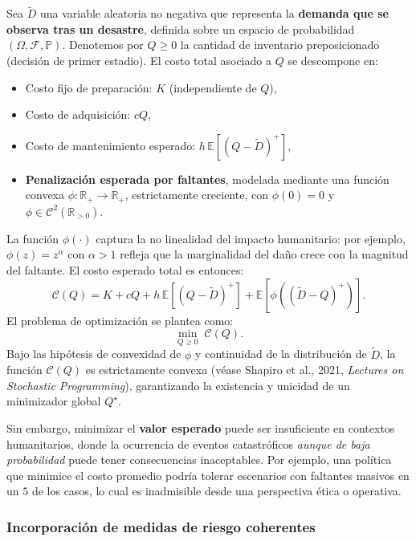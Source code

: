 \documentclass[
  spanish,
  us-letterpaper,
]{scrreprt}
\providecommand{\tightlist}{%
  \setlength{\itemsep}{0pt}\setlength{\parskip}{0pt}}
\numberwithin{equation}{section}
\begin{document}
Sea \(\tilde{D}\) una variable aleatoria no negativa que representa la
\textbf{demanda que se observa tras un desastre}, definida sobre un
espacio de probabilidad \((\Omega, \mathcal{F}, \mathbb{P})\). Denotemos
por \(Q \geq 0\) la cantidad de inventario preposicionado (decisión de
primer estadio). El costo total asociado a \(Q\) se descompone en:

\begin{itemize}
\tightlist
\item
  Costo fijo de preparación: \(K\) (independiente de \(Q\)),\\
\item
  Costo de adquisición: \(c Q\),\\
\item
  Costo de mantenimiento esperado:
  \(h \, \mathbb{E}[(Q - \tilde{D})^+]\),\\
\item
  \textbf{Penalización esperada por faltantes}, modelada mediante una
  función convexa \(\phi: \mathbb{R}_+ \to \mathbb{R}_+\), estrictamente
  creciente, con \(\phi(0) = 0\) y
  \(\phi \in \mathcal{C}^2(\mathbb{R}_{>0})\).
\end{itemize}

La función \(\phi(\cdot)\) captura la no linealidad del impacto
humanitario: por ejemplo, \(\phi(z) = z^\alpha\) con \(\alpha > 1\)
refleja que la marginalidad del daño crece con la magnitud del faltante.
El costo esperado total es entonces: \[
\mathcal{C}(Q) = K + c Q + h \, \mathbb{E}[(Q - \tilde{D})^+] + \mathbb{E}[\phi((\tilde{D} - Q)^+)].
\] El problema de optimización se plantea como: \[
\min_{Q \geq 0} \; \mathcal{C}(Q).
\] Bajo las hipótesis de convexidad de \(\phi\) y continuidad de la
distribución de \(\tilde{D}\), la función \(\mathcal{C}(Q)\) es
estrictamente convexa (véase Shapiro et al., 2021, \emph{Lectures on
Stochastic Programming}), garantizando la existencia y unicidad de un
minimizador global \(Q^\star\).

Sin embargo, minimizar el \textbf{valor esperado} puede ser insuficiente
en contextos humanitarios, donde la ocurrencia de eventos catastróficos
\emph{aunque de baja probabilidad} puede tener consecuencias
inaceptables. Por ejemplo, una política que minimice el costo promedio
podría tolerar escenarios con faltantes masivos en un \(5%
\) de los casos, lo cual es inadmisible desde una perspectiva ética o
operativa.

\subsubsection{Incorporación de medidas de riesgo
coherentes}\label{incorporaciuxf3n-de-medidas-de-riesgo-coherentes}
\end{document}
